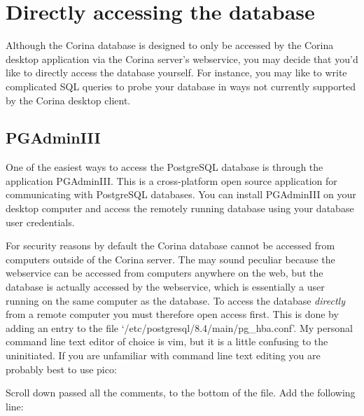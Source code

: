 
\section{Directly accessing the database}
Although the Corina database is designed to only be accessed by the Corina desktop application via the Corina server's webservice, you may decide that you'd like to directly access the database yourself.  For instance, you may like to write complicated SQL queries to probe your database in ways not currently supported by the Corina desktop client. 


\subsection{PGAdminIII}
One of the easiest ways to access the PostgreSQL database is through the application PGAdminIII.  This is a cross-platform open source application for communicating with PostgreSQL databases.  You can install PGAdminIII on your desktop computer and access the remotely running database using your database user credentials.  

For security reasons by default the Corina database cannot be accessed from computers outside of the Corina server.  The may sound peculiar because the webservice can be accessed from computers anywhere on the web, but the database is actually accessed by the webservice, which is essentially a user running on the same computer as the database.  To access the database \emph{directly} from a remote computer you must therefore open access first.  This is done by adding an entry to the file `/etc/postgresql/8.4/main/pg\_hba.conf'.  My personal command line text editor of choice is vim, but it is a little confusing to the uninitiated.  If you are unfamiliar with command line text editing you are probably best to use pico:


Scroll down passed all the comments, to the bottom of the file.  Add the following line:


